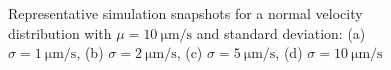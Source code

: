 \documentclass[../../master_thesis_np.tex]{subfiles}
\begin{document}
\begin{figure}[htp]
			\caption{Representative simulation snapshots for a normal velocity distribution with $\mu = \SI{10}{\um\per\second}$ and standard deviation: (a) $\sigma = \SI{1}{\um\per\second}$, (b) $\sigma = \SI{2}{\um\per\second}$, (c) $\sigma = \SI{5}{\um\per\second}$, (d) $\sigma = \SI{10}{\um\per\second}$}
			\label{fig:lj_vdist_situa}
		\end{figure}
		
		\begin{figure}[htp]
			\centering\
			\\
			\\
			\caption[]{}
		\end{figure}
\end{document}
